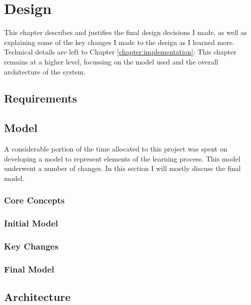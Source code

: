 \chapter{Design}
\label{chapter:design}
  This chapter describes and justifies the final design decisions I made, as well as explaining some of the key changes I made to the design as I learned more. Technical details are left to Chapter \ref{chapter:implementation}: This chapter remains at a higher level, focussing on the model used and the overall architecture of the system.

  \section{Requirements}
  \section{Model}
    A considerable portion of the time allocated to this project was spent on developing a model to represent elements of the learning process. This model underwent a number of changes. In this section I will mostly discuss the final model.

    \subsection{Core Concepts}
      

    \subsection{Initial Model}
    \subsection{Key Changes}
    \subsection{Final Model}
  \section{Architecture}

